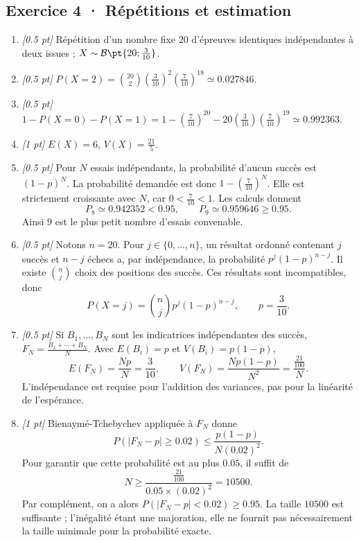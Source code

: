 \subsection*{Exercice 4 · Répétitions et estimation}\begin{enumerate}

\item \textit{[\num{0,5} pt]} Répétition d'un nombre fixe $20$ d'épreuves identiques indépendantes à deux issues ; $X\sim\mathcal B\pt{20;\frac{3}{10}}$.

\item \textit{[\num{0,5} pt]} $P(X=2)=\binom{20}2(\frac{3}{10})^2(\frac{7}{10})^{18}\simeq\num{0,027846}$.

\item \textit{[\num{0,5} pt]} $1-P(X=0)-P(X=1)=1-(\frac{7}{10})^{20}-20(\frac{3}{10})(\frac{7}{10})^{19}\simeq\num{0,992363}$.

\item \textit{[1 pt]} $E(X)=6$, $V(X)=\frac{21}{5}$.

\item \textit{[\num{0,5} pt]} Pour $N$ essais indépendants, la probabilité d'aucun succès est $(1-p)^N$. La probabilité demandée est donc $1-(\frac{7}{10})^N$. Elle est strictement croissante avec $N$, car $0<\frac{7}{10}<1$. Les calculs donnent
\[P_{8}\simeq\num{0,942352}<\num{0,95},\qquad P_{9}\simeq\num{0,959646}\ge\num{0,95}.\]
Ainsi $9$ est le plus petit nombre d'essais convenable.

\item \textit{[\num{0,5} pt]} Notons $n=20$. Pour $j\in\{0,\ldots,n\}$, un résultat ordonné contenant $j$ succès et $n-j$ échecs a, par indépendance, la probabilité $p^j(1-p)^{n-j}$. Il existe $\binom nj$ choix des positions des succès. Ces résultats sont incompatibles, donc
\[P(X=j)=\binom nj p^j(1-p)^{n-j},\qquad p=\frac{3}{10}.\]

\item \textit{[\num{0,5} pt]} Si $B_1,\ldots,B_N$ sont les indicatrices indépendantes des succès, $F_N=\frac{B_1+\cdots+B_N}{N}$. Avec $E(B_i)=p$ et $V(B_i)=p(1-p)$,
\[E(F_N)=\frac{Np}{N}=\frac{3}{10},\qquad V(F_N)=\frac{Np(1-p)}{N^2}=\frac{\frac{21}{100}}{N}.\]
L'indépendance est requise pour l'addition des variances, pas pour la linéarité de l'espérance.

\item \textit{[1 pt]} Bienaymé-Tchebychev appliquée à $F_N$ donne
\[P(|F_N-p|\ge\num{0,02})\le\frac{p(1-p)}{N(\num{0,02})^2}.\]
Pour garantir que cette probabilité est au plus $\num{0,05}$, il suffit de
\[N\ge\frac{\frac{21}{100}}{\num{0,05}\times(\num{0,02})^2}=10500.\]
Par complément, on a alors $P(|F_N-p|<\num{0,02})\ge\num{0,95}$. La taille $10500$ est suffisante ; l'inégalité étant une majoration, elle ne fournit pas nécessairement la taille minimale pour la probabilité exacte.

\end{enumerate}

\fi

\fi

